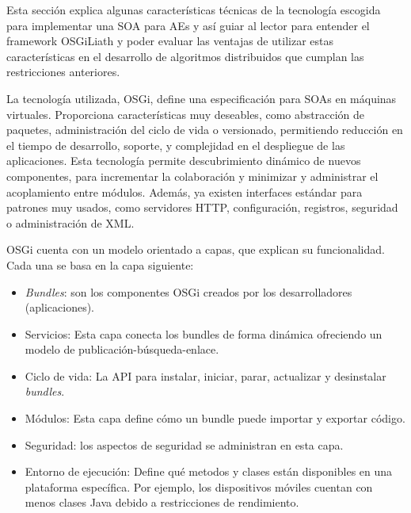 \documentclass[runningheads]{llncs}
\begin{document}
Esta sección explica algunas características técnicas de la tecnología escogida para implementar una SOA para AEs y así guiar al lector para entender el framework OSGiLiath y poder evaluar las ventajas de utilizar estas características en el desarrollo de algoritmos distribuidos que cumplan las restricciones anteriores.

La tecnología utilizada, OSGi, define una especificación para SOAs en máquinas virtuales. Proporciona características muy deseables, como abstracción de paquetes, administración del ciclo de vida o versionado, permitiendo reducción en el tiempo de desarrollo, soporte, y complejidad en el despliegue de las aplicaciones. Esta tecnología permite descubrimiento dinámico de nuevos componentes, para incrementar la colaboración y minimizar y administrar el acoplamiento entre módulos. Además, ya existen interfaces estándar para patrones muy usados, como servidores HTTP, configuración, registros, seguridad o administración de XML.

OSGi cuenta con un modelo orientado a capas, que explican su funcionalidad. Cada una se basa en la capa siguiente:

\begin{itemize}
\item {\em Bundles}: son los componentes OSGi creados por los desarrolladores
  (aplicaciones). %
\item Servicios: Esta capa conecta los bundles de forma dinámica ofreciendo un modelo de publicación-búsqueda-enlace.
\item Ciclo de vida: La API para instalar, iniciar, parar, actualizar y desinstalar {\em bundles}.
\item Módulos: Esta capa define cómo un bundle puede importar y exportar código.
\item Seguridad: los aspectos de seguridad se administran en esta capa.
\item Entorno de ejecución: Define qué metodos y clases están disponibles en una plataforma específica. Por ejemplo, los dispositivos móviles cuentan con menos clases Java debido a restricciones de rendimiento.
\end{itemize}
\end{document}

